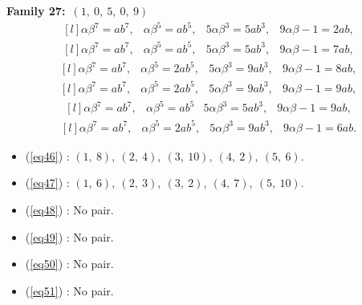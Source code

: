\documentclass[12pt,a4wide, reqno]{amsart}
\theoremstyle{definition}
\theoremstyle{remark}
\numberwithin{equation}{section}
\begin{document}
    \textbf{Family 27:}~$(1,~0,~5,~0,~9)$ 
\begin{equation}\label{eq46}
    \begin{matrix*}[l]
         \alpha \beta ^7=ab^7, & \alpha \beta ^5=ab^5, & 5\alpha \beta ^3=5ab ^3, & 9\alpha\beta-1=2ab,
    \end{matrix*}
\end{equation}
\begin{equation}\label{eq47}
    \begin{matrix*}[l]
          \alpha \beta ^7=ab^7, & \alpha \beta ^5=ab^5, & 5\alpha \beta ^3=5ab ^3, & 9\alpha\beta-1=7ab,
    \end{matrix*}
\end{equation}
\begin{equation}\label{eq48}
    \begin{matrix*}[l]
          \alpha \beta ^7=ab^7, & \alpha \beta ^5=2ab^5, & 5\alpha \beta ^3=9ab ^3, & 9\alpha\beta-1=8ab,
    \end{matrix*}
\end{equation}
\begin{equation}\label{eq49}
    \begin{matrix*}[l]
          \alpha \beta ^7=ab^7, & \alpha \beta ^5=2ab^5, & 5\alpha \beta ^3=9ab^3, & 9\alpha\beta-1=9ab,
    \end{matrix*}
\end{equation}
\begin{equation}\label{eq50}
    \begin{matrix*}[l]
          \alpha \beta ^7=ab^7, & \alpha \beta ^5=ab^5 & 5\alpha \beta ^3=5ab ^3, & 9\alpha\beta-1=9ab,
    \end{matrix*}
\end{equation}
\begin{equation}\label{eq51}
    \begin{matrix*}[l]
          \alpha \beta ^7=ab^7, & \alpha \beta ^5=2ab^5, & 5\alpha \beta ^3=9ab ^3, & 9\alpha\beta-1=6ab.
    \end{matrix*}
\end{equation}

\begin{itemize}
    \item 
    (\ref{eq46}) : $(1,~8),~(2,~4),~(3,~10),~(4,~2),~(5,~6).$
    \item 
    (\ref{eq47}) : $(1,~6),~(2,~3),~(3,~2),~(4,~7),~(5,~10).$
    \item 
    (\ref{eq48}) : No pair.
    \item 
    (\ref{eq49}) : No pair.
    \item 
    (\ref{eq50}) : No pair.
    \item
    (\ref{eq51}) : No pair.
    \end{itemize}
\end{document}
